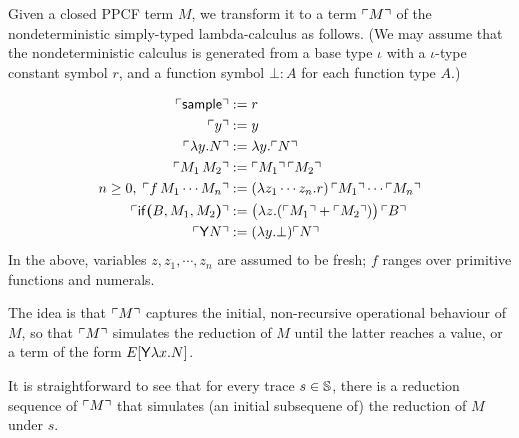 Given a closed PPCF term $M$, we transform it to a term ${\ulcorner{M}\urcorner}$ of the nondeterministic simply-typed lambda-calculus as follows.
(We may assume that the nondeterministic calculus is generated from a base type $\iota$ with a $\iota$-type constant symbol $r$, and a function symbol $\bot : A$  for each function type $A$.)
\iffalse
\begin{enumerate}
\item replace every $\tsample$ by $r$ 

\item replace each base-type subterm $f \, M_1 \cdots M_n$ by $(\lambda x_1 \cdots x_n . r) \, \transform{M_1} \cdots \transform{M_n}$ where $f$ is a primitive function

\item replace every subterm $\tif{B}{M_1}{M_2}$ by
$(\lambda x . \transform{M_1} + \transform{M_2}) \, \transform{B}$, for a fresh $x$

\item replace every $\tY \, f \, x . N$ by $\lambda x . \transform{N}[\bot / f]$
\end{enumerate}
\lo{The above rules can be defined formally.}
\fi
\begin{align*}
{\ulcorner{\mathsf{sample}}\urcorner} &:= r\\
{\ulcorner{y}\urcorner} &:= y \\
{\ulcorner{\lambda y . N}\urcorner} &:= \lambda y . {\ulcorner{N}\urcorner}\\
{\ulcorner{M_1 \, M_2}\urcorner} &:= {\ulcorner{M_1}\urcorner} \, {\ulcorner{M_2}\urcorner} \\
n \geq 0, \; {\ulcorner{f \, M_1 \cdots M_n}\urcorner} &:= (\lambda z_1 \cdots z_n . r) \, {\ulcorner{M_1}\urcorner} \cdots {\ulcorner{M_n}\urcorner} \\
{\ulcorner{\mathsf{if}\boldsymbol{(}B, M_1, M_2\boldsymbol{)}}\urcorner} &:= \big(\lambda z . ({\ulcorner{M_1}\urcorner} + {\ulcorner{M_2}\urcorner})\big) \, {\ulcorner{B}\urcorner} \\
{\ulcorner{\mathsf{Y}N}\urcorner} &:= (\lambda y . \bot) {\ulcorner{N}\urcorner}
\end{align*}
In the above, variables $z, z_1, \cdots, z_n$ are assumed to be fresh; $f$ ranges over primitive functions and numerals.

The idea is that ${\ulcorner{M}\urcorner}$ captures the initial, non-recursive operational behaviour of $M$, so that ${\ulcorner{M}\urcorner}$ simulates the reduction of $M$ until the latter reaches a value, or a term of the form $E[\mathsf{Y} \lambda x. N]$.

It is straightforward to see that for every trace $s \in {\mathbb{S}}$, there is a reduction sequence of ${\ulcorner{M}\urcorner}$ that simulates (an initial subsequene of) the reduction of $M$ under $s$.

